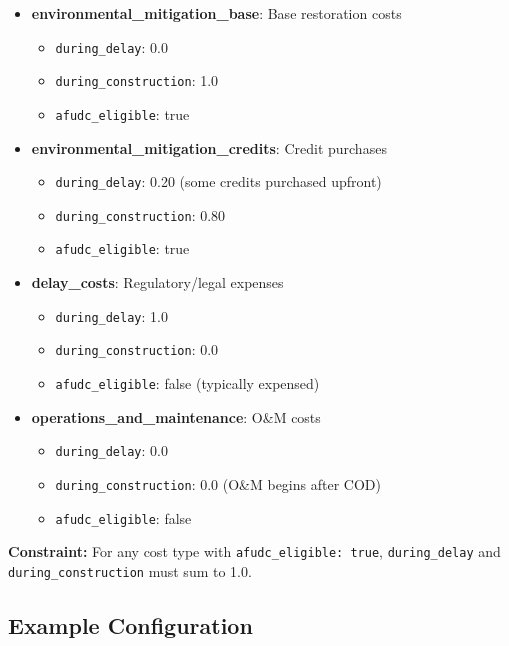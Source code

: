 \documentclass[ctcc_full_documentation.tex]{subfiles}
\begin{document}
\begin{itemize}
    \item \textbf{environmental\_mitigation\_base}: Base restoration costs
    \begin{itemize}
        \item \texttt{during\_delay}: 0.0
        \item \texttt{during\_construction}: 1.0
        \item \texttt{afudc\_eligible}: true
    \end{itemize}
    
    \item \textbf{environmental\_mitigation\_credits}: Credit purchases
    \begin{itemize}
        \item \texttt{during\_delay}: 0.20 (some credits purchased upfront)
        \item \texttt{during\_construction}: 0.80
        \item \texttt{afudc\_eligible}: true
    \end{itemize}
    
    \item \textbf{delay\_costs}: Regulatory/legal expenses
    \begin{itemize}
        \item \texttt{during\_delay}: 1.0
        \item \texttt{during\_construction}: 0.0
        \item \texttt{afudc\_eligible}: false (typically expensed)
    \end{itemize}
    
    \item \textbf{operations\_and\_maintenance}: O\&M costs
    \begin{itemize}
        \item \texttt{during\_delay}: 0.0
        \item \texttt{during\_construction}: 0.0 (O\&M begins after COD)
        \item \texttt{afudc\_eligible}: false
    \end{itemize}
\end{itemize}

\textbf{Constraint:} For any cost type with \texttt{afudc\_eligible: true}, \texttt{during\_delay} and \texttt{during\_construction} must sum to 1.0.

\subsection{Example Configuration}
\end{document}
